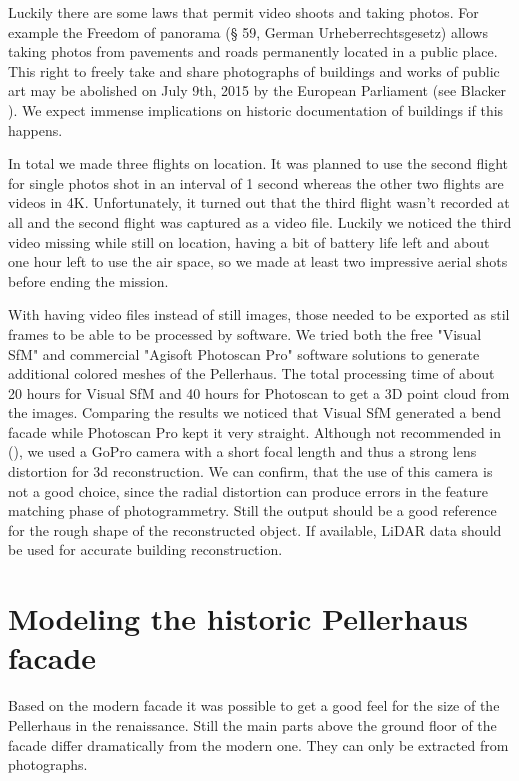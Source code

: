 Luckily there are some laws that permit video shoots and taking photos. For example the Freedom of panorama (§ 59, German Urheberrechtsgesetz) allows taking photos from pavements and roads permanently located in a public place. This right to freely take and share photographs of buildings and works of public art may be abolished on July 9th, 2015 by the European Parliament (see Blacker \parencite{freedomOfPanoramaUnderAttack}). We expect immense implications on historic documentation of buildings if this happens.

In total we made three flights on location. It was planned to use the second flight for single photos shot in an interval of 1 second whereas the other two flights are videos in 4K. Unfortunately, it turned out that the third flight wasn't recorded at all and the second flight was captured as a video file. Luckily we noticed the third video missing while still on location, having a bit of battery life left and about one hour left to use the air space, so we made at least two impressive aerial shots before ending the mission.

With having video files instead of still images, those needed to be exported as stil frames to be able to be processed by software. We tried both the free "Visual SfM" and commercial "Agisoft Photoscan Pro" software solutions to generate additional colored meshes of the Pellerhaus. The total processing time of about 20 hours for Visual SfM and 40 hours for Photoscan to get a 3D point cloud from the images. Comparing the results we noticed that Visual SfM generated a bend facade while Photoscan Pro kept it very straight. Although not recommended in (), we used a GoPro camera with a short focal length and thus a strong lens distortion for 3d reconstruction. We can confirm, that the use of this camera is not a good choice, since the radial distortion can produce errors in the feature matching phase of photogrammetry. Still the output should be a good reference for the rough shape of the reconstructed object. If available, LiDAR data should be used for accurate building reconstruction.

\section{Modeling the historic Pellerhaus facade}

Based on the modern facade it was possible to get a good feel for the size of the Pellerhaus in the renaissance. Still the main parts above the ground floor of the facade differ dramatically from the modern one. They can only be extracted from photographs.

